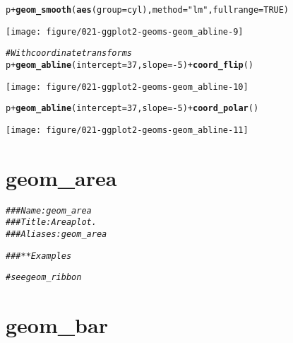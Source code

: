 \documentclass[a4paper,titlepage]{tufte-handout}\usepackage[]{graphicx}\usepackage[]{color}
\makeatletter
\def\maxwidth{ %
  \ifdim\Gin@nat@width>\linewidth
    \linewidth
  \else
    \Gin@nat@width
  \fi
}
\newcommand{\hlnum}[1]{\textcolor[rgb]{0.686,0.059,0.569}{#1}}%
\newcommand{\hlstr}[1]{\textcolor[rgb]{0.192,0.494,0.8}{#1}}%
\newcommand{\hlcom}[1]{\textcolor[rgb]{0.678,0.584,0.686}{\textit{#1}}}%
\newcommand{\hlopt}[1]{\textcolor[rgb]{0,0,0}{#1}}%
\newcommand{\hlstd}[1]{\textcolor[rgb]{0.345,0.345,0.345}{#1}}%
\newcommand{\hlkwc}[1]{\textcolor[rgb]{0.333,0.667,0.333}{#1}}%
\newcommand{\hlkwd}[1]{\textcolor[rgb]{0.737,0.353,0.396}{\textbf{#1}}}%
\newenvironment{kframe}{%
 \def\at@end@of@kframe{}%
 \ifinner\ifhmode%
  \def\at@end@of@kframe{\end{minipage}}%
  \begin{minipage}{\columnwidth}%
 \fi\fi%
 \def\FrameCommand##1{\hskip\@totalleftmargin \hskip-\fboxsep
 \colorbox{shadecolor}{##1}\hskip-\fboxsep
     \hskip-\linewidth \hskip-\@totalleftmargin \hskip\columnwidth}%
 \MakeFramed {\advance\hsize-\width
   \@totalleftmargin\z@ \linewidth\hsize
   \@setminipage}}%
 {\par\unskip\endMakeFramed%
 \at@end@of@kframe}
\newenvironment{knitrout}{}{} %
\makeatother
\begin{document}
\begin{knitrout}
\begin{kframe}
\begin{alltt}
\hlstd{p} \hlopt{+} \hlkwd{geom_smooth}\hlstd{(}\hlkwd{aes}\hlstd{(}\hlkwc{group}\hlstd{=cyl),} \hlkwc{method}\hlstd{=}\hlstr{"lm"}\hlstd{,} \hlkwc{fullrange}\hlstd{=}\hlnum{TRUE}\hlstd{)}
\end{alltt}
\end{kframe}
\texttt{[image: figure/021-ggplot2-geoms-geom\_abline-9]} 
\begin{kframe}\begin{alltt}
\hlcom{# With coordinate transforms}
\hlstd{p} \hlopt{+} \hlkwd{geom_abline}\hlstd{(}\hlkwc{intercept} \hlstd{=} \hlnum{37}\hlstd{,} \hlkwc{slope} \hlstd{=} \hlopt{-}\hlnum{5}\hlstd{)} \hlopt{+} \hlkwd{coord_flip}\hlstd{()}
\end{alltt}
\end{kframe}
\texttt{[image: figure/021-ggplot2-geoms-geom\_abline-10]} 
\begin{kframe}\begin{alltt}
\hlstd{p} \hlopt{+} \hlkwd{geom_abline}\hlstd{(}\hlkwc{intercept} \hlstd{=} \hlnum{37}\hlstd{,} \hlkwc{slope} \hlstd{=} \hlopt{-}\hlnum{5}\hlstd{)} \hlopt{+} \hlkwd{coord_polar}\hlstd{()}
\end{alltt}
\end{kframe}
\texttt{[image: figure/021-ggplot2-geoms-geom\_abline-11]} 

\end{knitrout}


\section{geom\_area}

\begin{knitrout}
\color{fgcolor}\begin{kframe}
\begin{alltt}
\hlcom{### Name: geom_area}
\hlcom{### Title: Area plot.}
\hlcom{### Aliases: geom_area}

\hlcom{### ** Examples}

\hlcom{# see geom_ribbon}
\end{alltt}
\end{kframe}
\end{knitrout}


\section{geom\_bar}
\end{document}

